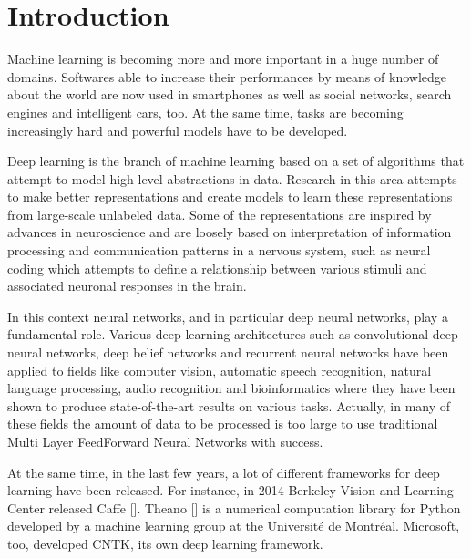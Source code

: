  \chapter{Introduction}\label{ch:introduction}

Machine learning is becoming more and more important in a huge number of domains. Softwares able to increase their performances by means of knowledge about the world are now used in smartphones as well as social networks, search engines and intelligent cars, too. At the same time, tasks are becoming increasingly hard and powerful models have to be developed.

Deep learning is the branch of machine learning based on a set of algorithms that attempt to model high level abstractions in data.
Research in this area attempts to make better representations and create models to learn these representations from large-scale unlabeled data. Some of the representations are inspired by advances in neuroscience and are loosely based on interpretation of information processing and communication patterns in a nervous system, such as neural coding which attempts to define a relationship between various stimuli and associated neuronal responses in the brain.

In this context neural networks, and in particular deep neural networks, play a fundamental role. Various deep learning architectures such as convolutional deep neural networks, deep belief networks and recurrent neural networks have been applied to fields like computer vision, automatic speech recognition, natural language processing, audio recognition and bioinformatics where they have been shown to produce state-of-the-art results on various tasks. Actually, in many of these fields the amount of data to be processed is too large to use traditional Multi Layer FeedForward Neural Networks with success.

At the same time, in the last few years, a lot of different frameworks for deep learning have been released. For instance, in 2014 Berkeley Vision and Learning Center released Caffe [\cite{jia2014caffe}]. Theano [\cite{2016arXiv160502688full}] is a numerical computation library for Python developed by a machine learning group at the Université de Montréal. Microsoft, too, developed CNTK,  its own deep learning framework.

